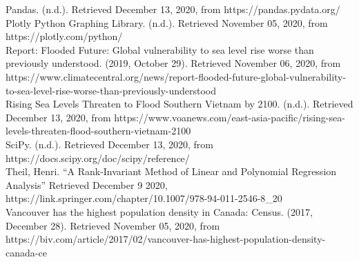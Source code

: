 \documentclass[fontsize=11pt]{article}
\begin{document}
\begin{hangparas}{.25in}{1}
        Pandas. (n.d.). Retrieved December 13, 2020, from https://pandas.pydata.org/ \\

        Plotly Python Graphing Library. (n.d.). Retrieved November 05, 2020, from https://plotly.com/python/ \\

        Report: Flooded Future: Global vulnerability to sea level rise worse than previously understood. (2019, October 29). Retrieved November 06, 2020, from https://www.climatecentral.org/news/report-flooded-future-global-vulnerability-to-sea-level-rise-worse-than-previously-understood \\

        Rising Sea Levels Threaten to Flood Southern Vietnam by 2100. (n.d.). Retrieved December 13, 2020, from https://www.voanews.com/east-asia-pacific/rising-sea-levels-threaten-flood-southern-vietnam-2100 \\

        SciPy. (n.d.). Retrieved December 13, 2020, from
        https://docs.scipy.org/doc/scipy/reference/ \\

        Theil, Henri. “A Rank-Invariant Method of Linear and Polynomial Regression Analysis” Retrieved December 9 2020, https://link.springer.com/chapter/10.1007/978-94-011-2546-8_20 \\

        Vancouver has the highest population density in Canada: Census. (2017, December 28). Retrieved November 05, 2020, from https://biv.com/article/2017/02/vancouver-has-highest-population-density-canada-ce

    \end{hangparas}
\end{document}
